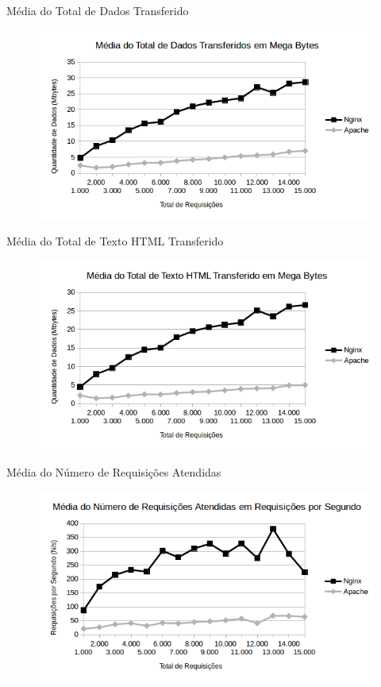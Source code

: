 \begin{frame}{Média do Total de Dados Transferido}
	\begin{figure}
		\centering
		\includegraphics[width=1\linewidth]{../graficos/grafico2} 
	\end{figure}
\end{frame}

\begin{frame}{Média do Total de Texto HTML Transferido}
	\begin{figure}
		\centering
		\includegraphics[width=1\linewidth]{../graficos/grafico3} 
	\end{figure}
\end{frame}

\begin{frame}{Média do Número de Requisições Atendidas}
	\begin{figure}
		\centering
		\includegraphics[width=1\linewidth]{../graficos/grafico4} 
	\end{figure}
\end{frame}

